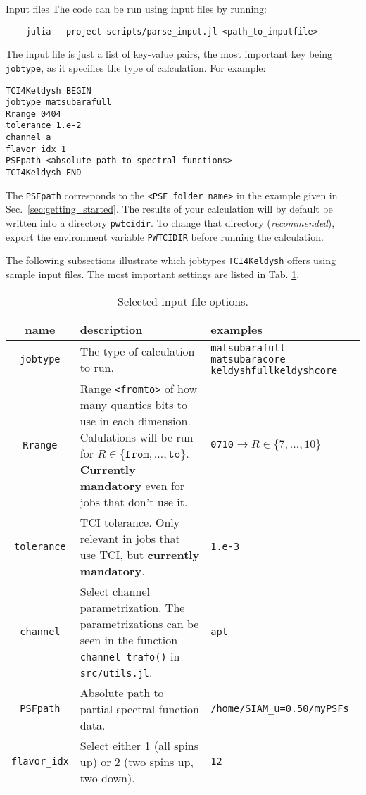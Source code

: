 \documentclass[12pt]{article}
\begin{document}
\begin{section}{Input files}
The code can be run using input files by running:
\begin{verbatim}
    julia --project scripts/parse_input.jl <path_to_inputfile>
\end{verbatim}
The input file is just a list of key-value pairs, the most important key being
\texttt{jobtype}, as it specifies the type of calculation. For example:
\begin{verbatim}
TCI4Keldysh BEGIN
jobtype matsubarafull
Rrange 0404
tolerance 1.e-2
channel a
flavor_idx 1
PSFpath <absolute path to spectral functions>
TCI4Keldysh END
\end{verbatim}
The \texttt{PSFpath} corresponds to the \texttt{<PSF folder name>} in the example given in Sec.\ \ref{sec:getting_started}.
The results of your calculation will by default be written into a directory \texttt{pwtcidir}. To change that directory (\textit{recommended}),
export the environment variable \texttt{PWTCIDIR} before running the calculation.

The following subsections illustrate which jobtypes \texttt{TCI4Keldysh} offers using sample input files.
The most important settings are listed in Tab. \ref{tab:options}.
\begin{table}[h]
    \centering
    \begin{tabular}{c|p{6cm}|p{5cm}}
        \toprule
        name & description & examples\\
        \midrule
            \texttt{jobtype} & The type of calculation to run. & \texttt{matsubarafull} \texttt{matsubaracore} \texttt{keldyshfull}\vfil \texttt{keldyshcore}\\
        \midrule
        \texttt{Rrange} &
        Range \texttt{<fromto>} of how many quantics bits to use in each dimension.
        Calulations will be run for $R\in\{\texttt{from},\ldots,\texttt{to}\}$.
        \textbf{Currently mandatory} even for jobs that don't use it. & \texttt{0710}$\rightarrow R\in\{7,\ldots,10\}$ \\
        \midrule
        \texttt{tolerance} & TCI tolerance. Only relevant in jobs that use TCI, but \textbf{currently mandatory}. & \texttt{1.e-3}\\
        \midrule
        \texttt{channel} & Select channel parametrization. The parametrizations can be seen in the function \texttt{channel\_trafo()} in \texttt{src/utils.jl}. & \texttt{a}\vfil \texttt{p}\vfil \texttt{t}\\
        \midrule
        \texttt{PSFpath} & Absolute path to partial spectral function data. & \texttt{/home/SIAM\_u=0.50/myPSFs}\\
        \midrule
        \texttt{flavor\_idx} & Select either 1 (all spins up) or 2 (two spins up, two down). & \texttt{1}\vfil \texttt{2}\\
        \bottomrule
    \end{tabular}
    \caption{Selected input file options.}
    \label{tab:options}
\end{table}

\end{section}
\end{document}
